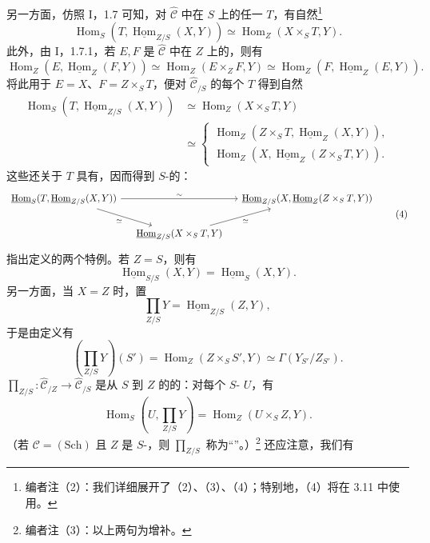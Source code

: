 另一方面，仿照 I，1.7 可知，对 $\widehat{\mathscr C}$ 中在 $S$ 上的任一 $T$，有自然\footnote{编者注（2）：我们详细展开了（2）、（3）、（4）；特别地，（4）将在 3.11 中使用。}
\[
\operatorname{Hom}_S(T,\underline{\operatorname{Hom}}_{Z/S}(X,Y))
\simeq\operatorname{Hom}_Z(X\times_S T,Y).\tag{2}
\]
此外，由 I，1.7.1，若 $E,F$ 是 $\widehat{\mathscr C}$ 中在 $Z$ 上的，则有
\[
\operatorname{Hom}_Z(E,\underline{\operatorname{Hom}}_Z(F,Y))
\simeq\operatorname{Hom}_Z(E\times_Z F,Y)
\simeq\operatorname{Hom}_Z(F,\underline{\operatorname{Hom}}_Z(E,Y)).
\]
将此用于 $E=X$、$F=Z\times_S T$，便对 $\widehat{\mathscr C}_{/S}$ 的每个 $T$ 得到自然
\[
\begin{aligned}
\operatorname{Hom}_S(T,\underline{\operatorname{Hom}}_{Z/S}(X,Y))
&\simeq\operatorname{Hom}_Z(X\times_S T,Y)\\
&\simeq\begin{cases}
\operatorname{Hom}_Z(Z\times_S T,\underline{\operatorname{Hom}}_Z(X,Y)),\\
\operatorname{Hom}_Z(X,\underline{\operatorname{Hom}}_Z(Z\times_S T,Y)).
\end{cases}
\end{aligned}\tag{3}
\]
这些还关于 $T$ 具有，因而得到 $S$-的：
\[
\begin{tikzcd}[column sep=small]
\underline{\operatorname{Hom}}_S(T,\underline{\operatorname{Hom}}_{Z/S}(X,Y))
\arrow[rr,"\sim"]\arrow[dr,"\simeq"']&&
\underline{\operatorname{Hom}}_{Z/S}(X,\underline{\operatorname{Hom}}_Z(Z\times_S T,Y))\\
&\underline{\operatorname{Hom}}_{Z/S}(X\times_S T,Y)\arrow[ur,"\simeq"']&
\end{tikzcd}\tag{4}
\]
指出定义的两个特例。若 $Z=S$，则有
\[
\underline{\operatorname{Hom}}_{S/S}(X,Y)=\underline{\operatorname{Hom}}_S(X,Y).
\]
另一方面，当 $X=Z$ 时，置
\[
\prod_{Z/S}Y=\underline{\operatorname{Hom}}_{Z/S}(Z,Y),\tag{5}
\]
于是由定义有
\[
\left(\prod_{Z/S}Y\right)(S')
=\operatorname{Hom}_Z(Z\times_S S',Y)\simeq\Gamma(Y_{S'}/Z_{S'}).
\]
 $\prod_{Z/S}:\widehat{\mathscr C}_{/Z}\to\widehat{\mathscr C}_{/S}$ 是从 $S$ 到 $Z$ 的的：对每个 $S$- $U$，有
\[
\operatorname{Hom}_S\left(U,\prod_{Z/S}Y\right)
=\operatorname{Hom}_Z(U\times_S Z,Y).
\]
（若 $\mathscr C=(\mathrm{Sch})$ 且 $Z$ 是 $S$-，则 $\prod_{Z/S}$ 称为“”。）\footnote{编者注（3）：以上两句为增补。} 还应注意，我们有
